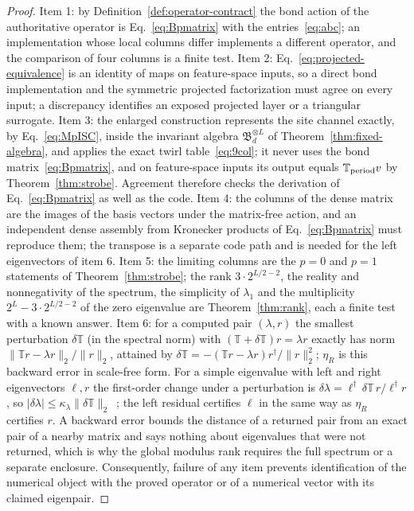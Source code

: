 \documentclass[aps,prx,reprint,superscriptaddress,nobibnotes,longbibliography]{revtex4-2}
\theoremstyle{remark}
\newcommand{\Tper}{\mathbb T_{\rm period}}
\begin{document}
\begin{proof}
Item 1: by Definition~\ref{def:operator-contract} the bond action of the authoritative operator is Eq.~\eqref{eq:Bpmatrix} with the entries~\eqref{eq:abc}; an implementation whose local columns differ implements a different operator, and the comparison of four columns is a finite test.  Item 2: Eq.~\eqref{eq:projected-equivalence} is an identity of maps on feature-space inputs, so a direct bond implementation and the symmetric projected factorization must agree on every input; a discrepancy identifies an exposed projected layer or a triangular surrogate.  Item 3: the enlarged construction represents the site channel exactly, by Eq.~\eqref{eq:MpISC}, inside the invariant algebra $\mathfrak B_d^{\otimes L}$ of Theorem~\ref{thm:fixed-algebra}, and applies the exact twirl table~\eqref{eq:9col}; it never uses the bond matrix~\eqref{eq:Bpmatrix}, and on feature-space inputs its output equals $\Tper v$ by Theorem~\ref{thm:strobe}.  Agreement therefore checks the derivation of Eq.~\eqref{eq:Bpmatrix} as well as the code.  Item 4: the columns of the dense matrix are the images of the basis vectors under the matrix-free action, and an independent dense assembly from Kronecker products of Eq.~\eqref{eq:Bpmatrix} must reproduce them; the transpose is a separate code path and is needed for the left eigenvectors of item 6.  Item 5: the limiting columns are the $p=0$ and $p=1$ statements of Theorem~\ref{thm:strobe}; the rank $3\cdot2^{L/2-2}$, the reality and nonnegativity of the spectrum, the simplicity of $\lambda_1$ and the multiplicity $2^L-3\cdot2^{L/2-2}$ of the zero eigenvalue are Theorem~\ref{thm:rank}, each a finite test with a known answer.  Item 6: for a computed pair $(\lambda,r)$ the smallest perturbation $\delta\mathbb T$ (in the spectral norm) with $(\mathbb T+\delta\mathbb T)r=\lambda r$ exactly has norm $\|\mathbb Tr-\lambda r\|_2/\|r\|_2$, attained by $\delta\mathbb T=-(\mathbb Tr-\lambda r)r^\dagger/\|r\|_2^2$; $\eta_R$ is this backward error in scale-free form.  For a simple eigenvalue with left and right eigenvectors $\ell,r$ the first-order change under a perturbation is $\delta\lambda=\ell^\dagger\,\delta\mathbb T\,r/\ell^\dagger r$, so $|\delta\lambda|\le\kappa_\lambda\|\delta\mathbb T\|_2$~\cite{StewartSun1990}; the left residual certifies $\ell$ in the same way as $\eta_R$ certifies $r$.  A backward error bounds the distance of a returned pair from an exact pair of a nearby matrix and says nothing about eigenvalues that were not returned, which is why the global modulus rank requires the full spectrum or a separate enclosure.  Consequently, failure of any item prevents identification of the numerical object with the proved operator or of a numerical vector with its claimed eigenpair.
\end{proof}
\end{document}

